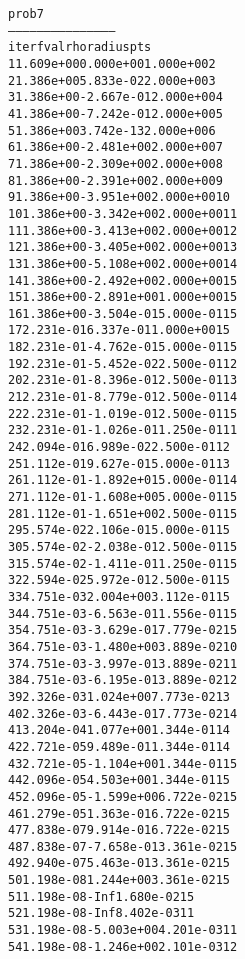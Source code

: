 \begin{alltt}
prob7
---------------------------------------------
iter        fval         rho      radius  pts
   1   1.609e+00   0.000e+00   1.000e+00    2
   2   1.386e+00   5.833e-02   2.000e+00    3
   3   1.386e+00  -2.667e-01   2.000e+00    4
   4   1.386e+00  -7.242e-01   2.000e+00    5
   5   1.386e+00   3.742e-13   2.000e+00    6
   6   1.386e+00  -2.481e+00   2.000e+00    7
   7   1.386e+00  -2.309e+00   2.000e+00    8
   8   1.386e+00  -2.391e+00   2.000e+00    9
   9   1.386e+00  -3.951e+00   2.000e+00   10
  10   1.386e+00  -3.342e+00   2.000e+00   11
  11   1.386e+00  -3.413e+00   2.000e+00   12
  12   1.386e+00  -3.405e+00   2.000e+00   13
  13   1.386e+00  -5.108e+00   2.000e+00   14
  14   1.386e+00  -2.492e+00   2.000e+00   15
  15   1.386e+00  -2.891e+00   1.000e+00   15
  16   1.386e+00  -3.504e-01   5.000e-01   15
  17   2.231e-01   6.337e-01   1.000e+00   15
  18   2.231e-01  -4.762e-01   5.000e-01   15
  19   2.231e-01  -5.452e-02   2.500e-01   12
  20   2.231e-01  -8.396e-01   2.500e-01   13
  21   2.231e-01  -8.779e-01   2.500e-01   14
  22   2.231e-01  -1.019e-01   2.500e-01   15
  23   2.231e-01  -1.026e-01   1.250e-01   11
  24   2.094e-01   6.989e-02   2.500e-01   12
  25   1.112e-01   9.627e-01   5.000e-01   13
  26   1.112e-01  -1.892e+01   5.000e-01   14
  27   1.112e-01  -1.608e+00   5.000e-01   15
  28   1.112e-01  -1.651e+00   2.500e-01   15
  29   5.574e-02   2.106e-01   5.000e-01   15
  30   5.574e-02  -2.038e-01   2.500e-01   15
  31   5.574e-02  -1.411e-01   1.250e-01   15
  32   2.594e-02   5.972e-01   2.500e-01   15
  33   4.751e-03   2.004e+00   3.112e-01   15
  34   4.751e-03  -6.563e-01   1.556e-01   15
  35   4.751e-03  -3.629e-01   7.779e-02   15
  36   4.751e-03  -1.480e+00   3.889e-02   10
  37   4.751e-03  -3.997e-01   3.889e-02   11
  38   4.751e-03  -6.195e-01   3.889e-02   12
  39   2.326e-03   1.024e+00   7.773e-02   13
  40   2.326e-03  -6.443e-01   7.773e-02   14
  41   3.204e-04   1.077e+00   1.344e-01   14
  42   2.721e-05   9.489e-01   1.344e-01   14
  43   2.721e-05  -1.104e+00   1.344e-01   15
  44   2.096e-05   4.503e+00   1.344e-01   15
  45   2.096e-05  -1.599e+00   6.722e-02   15
  46   1.279e-05   1.363e-01   6.722e-02   15
  47   7.838e-07   9.914e-01   6.722e-02   15
  48   7.838e-07  -7.658e-01   3.361e-02   15
  49   2.940e-07   5.463e-01   3.361e-02   15
  50   1.198e-08   1.244e+00   3.361e-02   15
  51   1.198e-08        -Inf   1.680e-02   15
  52   1.198e-08        -Inf   8.402e-03   11
  53   1.198e-08  -5.003e+00   4.201e-03   11
  54   1.198e-08  -1.246e+00   2.101e-03   12

\end{alltt}

